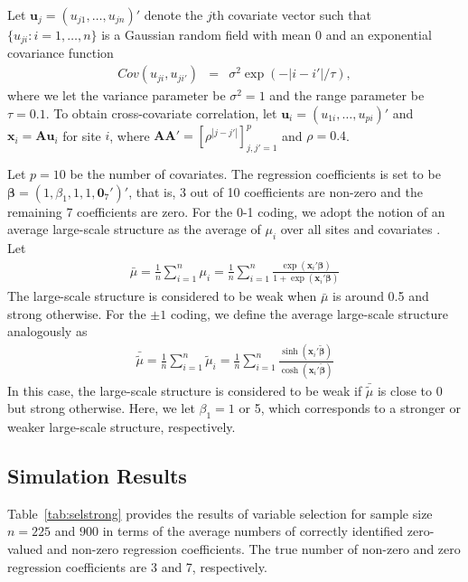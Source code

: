 \documentclass[authoryear,review, 11pt]{elsarticle}
\begin{document}
Let $\bm{u}_j=(u_{j1},\ldots,u_{jn})'$ denote the $j$th covariate vector such that $\{u_{ji}:i=1,\ldots,n\}$ is a Gaussian random field with mean 0 and an exponential covariance function
\begin{eqnarray}
Cov(u_{ji}, u_{ji'})&=&\sigma^2 \exp(-|i-i'|/ \tau), 
\end{eqnarray}
where we let the variance parameter be $\sigma^2=1$ and the range parameter be $\tau=0.1$.  
To obtain cross-covariate correlation, let $\bm{u}_i=(u_{1i},\ldots, u_{pi})'$ and $\bm{x}_i=\bm{A}\bm{u}_i$ for site $i$, where $\bm{A}\bm{A}'=[\rho^{|j-j'|}]^{p}_{j,j'=1}$ and $\rho=0.4$.

Let $p=10$ be the number of covariates.  The regression coefficients is set to be $\bm{\beta}=(1,\beta_1,1,1,\bm{0}_7')'$, that is, 3 out of 10 coefficients are non-zero and the remaining 7 coefficients are zero.  For the 0-1 coding, we adopt the notion of an average large-scale structure as the average of $\mu_i$ over all sites and covariates \citep{fanl01}.  Let
\begin{eqnarray}
\label{eqn:averlarge1}
\bar{\mu}=\frac{1}{n}\sum_{i=1}^{n}\mu_i=\frac{1}{n}\sum_{i=1}^{n}\frac{\exp({\bm{x}_i'\bm{\beta}})}{1+\exp(\bm{x}_i'\bm{\beta})}
\end{eqnarray}
The large-scale structure is considered to be weak when $\bar{\mu}$ is around 0.5 and strong otherwise. For the $\pm 1$ coding, we define the average large-scale structure analogously as
\begin{eqnarray}
\bar{\tilde{\mu}}=\frac{1}{n}\sum_{i=1}^{n}\tilde{\mu}_i=\frac{1}{n}\sum_{i=1}^{n}\frac{\sinh({\bm{x}_i'\tilde{\bm{\beta}}})}{\cosh(\bm{x}_i'\tilde{\bm{\beta}})}
\label{eqn:averlarge2}
\end{eqnarray}
In this case, the large-scale structure is considered to be weak if $\bar{\tilde{\mu}}$ is close to 0 but strong otherwise.  Here, we let $\beta_1=1$ or 5, which corresponds to a stronger or weaker large-scale structure, respectively.  

\subsection{Simulation Results}

Table~\ref{tab:selstrong} provides the results of variable selection for sample size $n=225$ and $900$ in terms of the average numbers of correctly identified zero-valued and non-zero regression coefficients. The true number of non-zero and zero regression coefficients are 3 and 7, respectively.  
\end{document}
